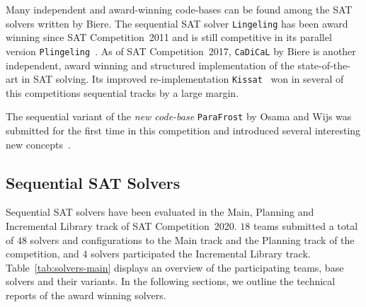 \documentclass{elsarticle}
\newcommand{\solver}[1]{\texttt{#1}}
\begin{document}
Many independent and award-winning code-bases can be found among the SAT solvers written by Biere. 
The sequential SAT solver \solver{Lingeling} has been award winning since SAT Competition~2011 and is still competitive in its parallel version \solver{Plingeling}~\cite{Biere:2012:Lingeling}. 
As of SAT Competition~2017, \solver{CaDiCaL} %
by Biere is another independent, award winning and structured implementation of the state-of-the-art in SAT solving. 
Its improved re-implementation \solver{Kissat}~\cite{Biere:SC2020} won in several of this competitions sequential tracks by a large margin. 

The sequential variant of the \emph{new code-base} \solver{ParaFrost} by Osama and Wijs was submitted for the first time in this competition and introduced several interesting new concepts~\cite{Osama:SC2020:Parafrost}. 


\subsection{Sequential SAT Solvers}
\label{sec:part:seq}

Sequential SAT solvers have been evaluated in the Main, Planning and Incremental Library track of SAT Competition~2020. 
$18$ teams submitted a total of $48$ solvers and configurations to the Main track and the Planning track of the competition, and $4$ solvers participated the Incremental Library track. 
%
Table~\ref{tab:solvers-main} displays an overview of the participating teams, base solvers and their variants. 
In the following sections, we outline the technical reports of the award winning solvers. 
\end{document}
